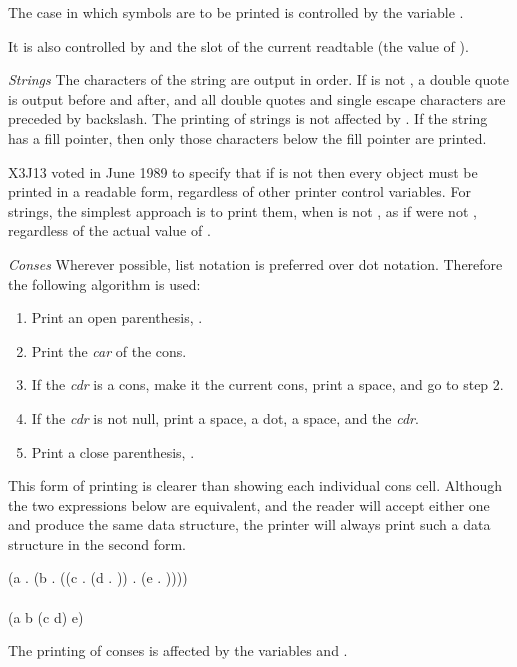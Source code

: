 \begin{flushdesc}
\begin{obsolete}
The case in which symbols are to be printed is controlled by the variable
.
\end{obsolete}
\begin{newer}
It is also controlled by  and the  slot of the current
readtable (the value of ).
\end{newer}
\begin{obsolete}
\item[\emph{Strings}]
The characters of the string are output in order.
If  is not {\false}, a double quote
is output before and after, and all
double quotes and single escape characters are preceded by backslash.
The printing of strings is not affected by .
If the string has a fill pointer, then only those characters below
the fill pointer are printed.
\end{obsolete}

\begin{newer}
X3J13 voted in June 1989  to specify that if 
is not {\false} then every object must be printed in a readable form,
regardless of other printer control variables.  For strings, the simplest approach
is to print them, when  is not {\false}, as if 
were not {\false}, regardless of the actual value of .
\end{newer}

\item[\emph{Conses}]
Wherever possible, list notation is preferred over dot
notation.  Therefore the following algorithm is used:
\begin{enumerate}
\item Print an open parenthesis, \cd{(}.
\item Print the \emph{car} of the cons.
\item If the \emph{cdr} is a cons, make it the current cons, print a space, and go to step 2.
\item If the \emph{cdr} is not null, print a space, a dot, a space, and the \emph{cdr}.
\item Print a close parenthesis, \cd{)}.
\end{enumerate}

This form of printing is clearer than showing each individual cons
cell.  Although the two expressions below are equivalent,
and the reader will accept
either one and produce the same data structure, the printer will
always print such a data structure in the second form.
\begin{lisp}
(a . (b . ((c . (d . {\nil})) . (e . {\nil})))) \\
\\
(a b (c d) e)
\end{lisp}
\begin{obsolete}
The printing of conses is affected by the variables 
and .
\end{obsolete}


\end{flushdesc}
